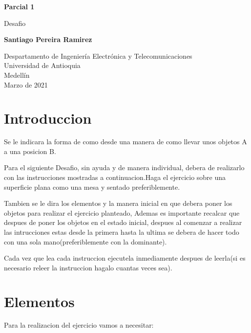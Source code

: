 \documentclass{article}
\begin{document}
\begin{titlepage}
    \begin{center}
        \vspace*{1cm}
            
        \Huge
        \textbf{Parcial 1 }
            
        \vspace{0.5cm}
        \LARGE
        Desafio
            
        \vspace{1.5cm}
            
        \textbf{Santiago Pereira Ramirez}
            
        \vfill
            
        \vspace{0.8cm}
            
        \Large
        Despartamento de Ingeniería Electrónica y Telecomunicaciones\\
        Universidad de Antioquia\\
        Medellín\\
        Marzo de 2021
            
    \end{center}
\end{titlepage}

\tableofcontents
\newpage
\section{Introduccion }\label{intro}
Se le indicara la forma de como desde una manera de como llevar unos objetos A a una posicion B.


Para el siguiente Desafio, sin ayuda y de manera individual, debera de realizarlo con las instrucciones mostradas a continuacion.Haga el ejercicio sobre una superficie plana como una mesa y sentado preferiblemente.

Tambien se le dira los elementos y la manera inicial en que debera poner los objetos para realizar el ejercicio planteado, Ademas es importante recalcar que despues de poner los objetos en el estado inicial, despues al comenzar a realizar las intrucciones estas desde la primera hasta la ultima se debera de hacer todo con una sola mano(preferiblemente con la dominante).


Cada vez que lea cada instruccion ejecutela inmediamente despues de leerla(si es necesario releer la instruccion hagalo cuantas veces sea).

\section{Elementos} \label{contenido}
Para la realizacion del ejercicio vamos a necesitar:
\end{document}
